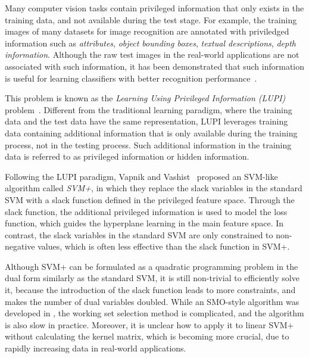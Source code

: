 
Many computer vision tasks contain privileged information that only
exists in the training data, and not available during the test
stage. For example, the training images of many datasets for image
recognition are annotated with priviledged information such as
\emph{attributes}, \emph{object bounding boxes}, \emph{textual
  descriptions}, \emph{depth information}.  Although the raw test
images in the real-world applications are not associated with such
information, it has been demonstrated that such information is
useful for learning classifiers with better recognition
performance~\cite{DaiCVPR2015,Feyereisl2015,Lampert2013,RankTransfer,SVMplus_vapnik,Wang2015,HuaGang2014}.

This problem is known as the \emph{Learning Using Privileged
  Information (LUPI)} problem~\cite{SVMplus_vapnik}. Different from
the traditional learning paradigm, where the training data and the
test data have the same representation, LUPI leverages training data
containing additional information that is only available during the
training process, not in the testing process. Such additional
information in the training data is referred to as privileged
information or hidden information.

Following the LUPI paradigm, Vapnik and Vashist~\cite{SVMplus_vapnik}
proposed an SVM-like algorithm called \emph{SVM+}, in which they
replace the slack variables in the standard SVM with a slack function
defined in the privileged feature space. Through the slack function,
the additional privileged information is used to model the loss
function, which guides the hyperplane learning in the main feature
space. In contrast, the slack variables in the standard SVM are only
constrained to non-negative values, which is often less effective than
the slack function in SVM+.



Although SVM+ can be formulated as a quadratic programming problem in
the dual form similarly as the standard SVM, it is still non-trivial
to efficiently solve it, because the introduction of the slack
function leads to more constraints, and makes the number of dual
variables doubled. While an SMO-style algorithm was developed in
\cite{Pechyony2010}, the working set selection method is complicated,
and the algorithm is also slow in practice. Moreover, it is unclear
how to apply it to linear SVM+ without calculating the kernel matrix,
which is becoming more crucial, due to rapidly increasing data in
real-world applications.

